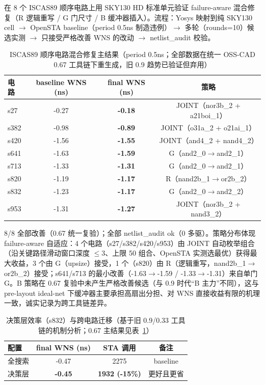 \documentclass[journal]{IEEEtran}
\begin{document}
在 8 个 ISCAS89 顺序电路上用 SKY130 HD 标准单元验证 failure-aware 混合修复（R 逻辑重写 / G 门尺寸 / B 缓冲器插入）。流程：Yosys 映射到纯 SKY130 cell $\rightarrow$ OpenSTA baseline（period 0.5ns 制造违例）$\rightarrow$ 多轮（rounds=10）候选实测 $\rightarrow$ 只接受严格改善 WNS 的改动 $\rightarrow$ netlist\_audit 校验。

\begin{table}[!t]
\centering
\caption{ISCAS89 顺序电路混合修复主结果（period 0.5ns；全部数据在统一 OSS-CAD 0.67 工具链下重生成，旧 0.9 趋势已验证但弃用）}
\label{tab:iscas_main}
\scriptsize
\setlength{\tabcolsep}{4pt}
\begin{tabular}{lccc}
\toprule
\textbf{电路} & \textbf{baseline WNS (ns)} & \textbf{final WNS (ns)} & \textbf{策略} \\
\midrule
s27 & -0.27 & \textbf{-0.18} & JOINT（nor3b\_2 + a21boi\_1） \\
s382 & -0.98 & \textbf{-0.89} & JOINT（o31a\_2 + o21ai\_1） \\
s420 & -1.56 & \textbf{-1.55} & JOINT（and4\_2 + nand4\_2） \\
s641 & -1.63 & \textbf{-1.59} & G（and2\_0$\rightarrow$and2\_1） \\
s713 & -1.33 & \textbf{-1.31} & G（and2\_0$\rightarrow$and2\_1） \\
s820 & -1.19 & \textbf{-1.17} & R（nand2b\_1$\rightarrow$or2b\_2） \\
s832 & -1.23 & \textbf{-1.17} & G（and2\_0$\rightarrow$and2\_2） \\
s953 & -1.31 & \textbf{-1.27} & JOINT（nor3b\_2 + nand3\_2） \\
\bottomrule
\end{tabular}
\end{table}

8/8 全部改善（0.67 统一复验）；全部 netlist\_audit ok（0 多驱）。策略分布体现 failure-aware 自适应：4 个电路（s27/s382/s420/s953）由 JOINT 自动枚举组合（沿关键路径滑动窗口深度 $\le 3$、上限 50 组合、OpenSTA 实测选最优）获得最大收益，3 个由 G（upsize）接受，1 个（s820）由 R（逻辑重写，nand2b\_1$\rightarrow$or2b\_2）接受；s641/s713 的最小改善（-1.63$\rightarrow$-1.59 / -1.33$\rightarrow$-1.31）来自单门 G。B 策略在 0.67 复验中未产生严格改善候选（与 0.9 时代“B 主力”不同），这与 pre-layout ideal-net 下缓冲器主要承担高扇出分担、对 WNS 直接收益有限的机理一致，诚实记录为跨工具链差异。


\begin{table}[!t]
\centering
\caption{决策层效率（s832）与跨电路迁移（基于旧 0.9/0.33 工具链的机制分析；0.67 主结果见表~\ref{tab:iscas_main}）}
\label{tab:selector}
\scriptsize
\setlength{\tabcolsep}{4pt}
\begin{tabular}{lccc}
\toprule
\textbf{配置} & \textbf{final WNS (ns)} & \textbf{STA 调用} & \textbf{备注} \\
\midrule
全搜索 & -0.47 & 2275 & baseline \\
决策层 & \textbf{-0.45} & \textbf{1932 (-15\%)} & 更好且更省 \\
\bottomrule
\end{tabular}
\end{table}
\end{document}
